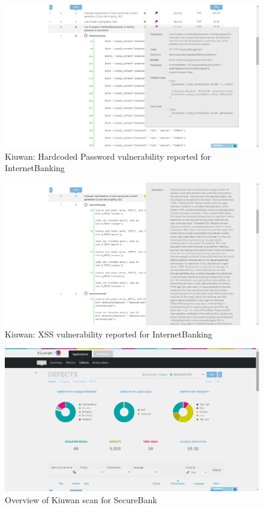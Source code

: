 \begin{figure}[ht]
	\centering
	\includegraphics[width=.8\linewidth]{figures/kiuwan_hardcoded_password.png}
	\caption{Kiuwan: Hardcoded Password vulnerability reported for InternetBanking}
	\label{fig:kiuwan_hardcoded_password}
\end{figure}

\begin{figure}[ht]
	\centering
	\includegraphics[width=.8\linewidth]{figures/kiuwan_xss.png}
	\caption{Kiuwan: XSS vulnerability reported for InternetBanking}
	\label{fig:kiuwan_xss}
\end{figure}

\begin{figure}[ht]
	\centering
	\includegraphics[width=.8\linewidth]{figures/kiuwan_overview_secure_bank.png}
	\caption{Overview of Kiuwan scan for SecureBank}
	\label{fig:kiuwan_overview_secure_bank}
\end{figure}